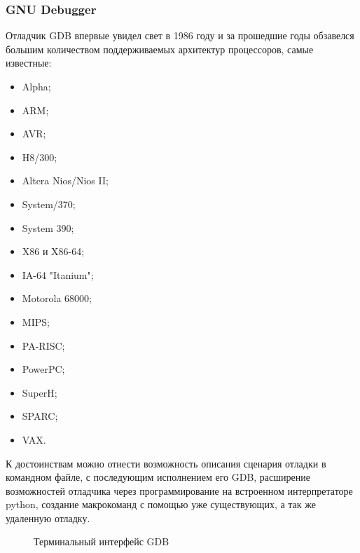 \subsubsection{GNU Debugger}\label{sec:ch1/sec3/sub2/sub2}
Отладчик GDB впервые увидел свет в 1986 году и за прошедшие годы обзавелся
большим количеством поддерживаемых архитектур процессоров, самые известные:
\begin{itemize}
    \item Alpha;
    \item ARM;
    \item AVR;
    \item H8/300;
    \item Altera Nios/Nios II;
    \item System/370;
    \item System 390;
    \item X86 и X86-64;
    \item IA-64 "Itanium";
    \item Motorola 68000;
    \item MIPS;
    \item PA-RISC;
    \item PowerPC;
    \item SuperH;
    \item SPARC;
    \item VAX.
\end{itemize}
К достоинствам можно отнести возможность описания сценария отладки в командном файле,
с последующим исполнением его GDB, расширение возможностей отладчика через программирование
на встроенном интерпретаторе python, создание макрокоманд с помощью уже существующих,
а так же удаленную отладку.
\begin{figure}[!htbp]
    \caption{Терминальный интерфейс GDB \label{fig:gdb-tui}}
\end{figure}

